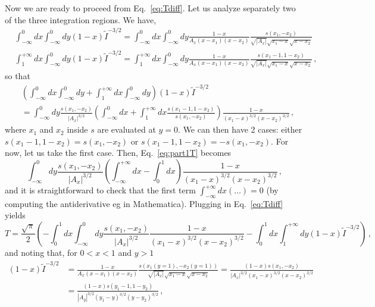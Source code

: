 \documentclass[twoside]{article}
\begin{document}
Now we are ready to proceed from Eq.~\eqref{eq:Tdiff}. Let us analyze separately two of the three integration regions. We have,
\begin{align}
&\int_{-\infty}^0 dx \int_{-\infty}^0 dy (1-x)\tilde{I}^{-3/2} = \int_{-\infty}^0 dx \int_{-\infty}^0 dy \frac{1-x}{A_x (x-x_1)(x-x_2)}\frac{s(x_1,-x_2)}{\sqrt{|A_x|}\sqrt{x_1-x}\sqrt{x-x_2}} \\
&\int_{1}^{+\infty} dx \int_{-\infty}^{0}dy (1-x)\tilde{I}^{-3/2}
= \int_{1}^{+\infty} dx \int_{-\infty}^{0}dy \frac{1-x}{A_x (x-x_1)(x-x_2)}\frac{s(x_1-1,1-x_2)}{\sqrt{|A_x|}\sqrt{x_1-x}\sqrt{x-x_2}}\,,
\end{align}
so that 
\begin{equation}
\label{eq:part1T}
\begin{split}
&\left(\int_{-\infty}^0 dx \int_{-\infty}^0 dy 
+ \int_{1}^{+\infty} dx \int_{-\infty}^{0}dy\right) (1-x)\tilde{I}^{-3/2}\\
& = \int_{-\infty}^0 dy \frac{s(x_1,-x_2)}{|A_x|^{3/2}} \left(\int_{-\infty}^0 dx 
+ \int_{1}^{+\infty} dx \frac{s(x_1-1,1-x_2)}{s(x_1,-x_2)}\right) \frac{1-x}{(x_1-x)^{3/2}(x-x_2)^{3/2}}\,,
\end{split}
\end{equation}
where $x_1$ and $x_2$ inside $s$ are evaluated at $y=0$.
We can then have 2 cases: either $s(x_1-1,1-x_2)=s(x_1,-x_2)$ or $s(x_1-1,1-x_2)=-s(x_1,-x_2)$. 
For now, let us take the first case. Then, Eq.~\eqref{eq:part1T} becomes
\begin{equation}
  \label{eq:xpartT}
\int_{-\infty}^0 dy \frac{s(x_1,-x_2)}{|A_x|^{3/2}} \left(\int_{-\infty}^{+\infty} dx 
- \int_{0}^1 dx \right) \frac{1-x}{(x_1-x)^{3/2}(x-x_2)^{3/2}}\,,
\end{equation}
and it is straightforward to check that the first term $\int_{-\infty}^{+\infty} dx (\ldots)=0$ (by computing the antiderivative eg in Mathematica).
Plugging in Eq.~\eqref{eq:Tdiff} yields
\begin{equation}
\label{eq:Tdiff2}
T =  \frac{\sqrt{\pi}}{2}\left(-\int_0^1 dx \int_{-\infty}^0 dy \frac{s(x_1,-x_2)}{|A_x|^{3/2}} \frac{1-x}{(x_1-x)^{3/2}(x-x_2)^{3/2}}
-\int_0^1 dx \int_{1}^{+\infty}dy
(1-x)\tilde{I}^{-3/2}\right) \,, 
\end{equation}
and noting that, for $0<x<1$ and $y>1$
\begin{equation}
\begin{split}
(1-x)\tilde{I}^{-3/2} &= \frac{1-x}{A_x (x-x_1)(x-x_2)}\frac{s(x_1(y=1),-x_2(y=1))}{\sqrt{|A_x|}\sqrt{x_1-x}\sqrt{x-x_2}} = \frac{(1-x)s(x_1,-x_2)}{|A_x|^{3/2} (x_1-x)^{3/2}(x-x_2)^{3/2}}\\
&=\frac{(1-x)s(y_1-1,1-y_2)}{|A_y|^{3/2} (y_1-y)^{3/2}(y-y_2)^{3/2}}\,,
\end{split}
\end{equation}
\end{document}
